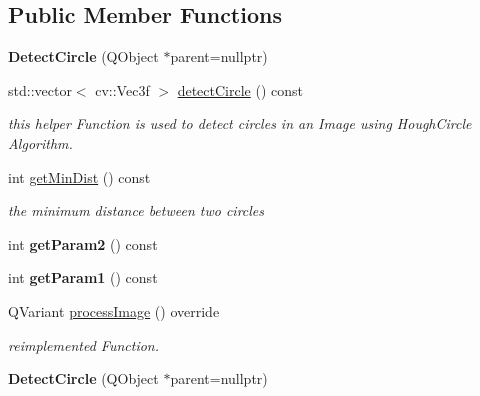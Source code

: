\subsection*{Public Member Functions}
\begin{DoxyCompactItemize}
\item 
\mbox{\label{class_image_processor_1_1_detect_circle_addc37fab154547b0b3b7b7e78bf71d04}} 
{\bfseries Detect\+Circle} (Q\+Object $\ast$parent=nullptr)
\item 
std\+::vector$<$ cv\+::\+Vec3f $>$ \hyperlink{class_image_processor_1_1_detect_circle_a6324c8bfcc4e8df8d584a037250b22b2}{detect\+Circle} () const
\begin{DoxyCompactList}\small\item\em this helper Function is used to detect circles in an Image using Hough\+Circle Algorithm. \end{DoxyCompactList}\item 
int \hyperlink{class_image_processor_1_1_detect_circle_a9e83f089602650f7afcb97172a23f329}{get\+Min\+Dist} () const
\begin{DoxyCompactList}\small\item\em the minimum distance between two circles \end{DoxyCompactList}\item 
\mbox{\label{class_image_processor_1_1_detect_circle_a8a54460ead0a0204e6321215851d9234}} 
int {\bfseries get\+Param2} () const
\item 
\mbox{\label{class_image_processor_1_1_detect_circle_a4f7719cf36a987db2eb64dc5d8cf0779}} 
int {\bfseries get\+Param1} () const
\item 
Q\+Variant \hyperlink{class_image_processor_1_1_detect_circle_ae0c7b4759827b218a03b16567233b4d5}{process\+Image} () override
\begin{DoxyCompactList}\small\item\em reimplemented Function. \end{DoxyCompactList}\item 
\mbox{\label{class_image_processor_1_1_detect_circle_a0555aef83fdcd99655e724f4bf49aeb4}} 
{\bfseries Detect\+Circle} (Q\+Object $\ast$parent=nullptr)
\item 

\end{DoxyCompactItemize}
